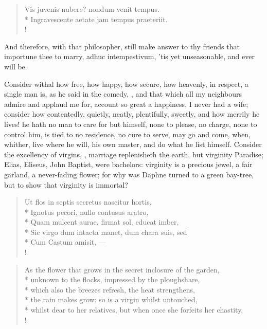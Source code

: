 \begin{latin}%
\begin{verse}%
Vis juvenis nubere? nondum venit tempus.\\*
Ingravescente aetate jam tempus praeteriit.\\!
\end{verse}%
\end{latin}%

And therefore, with that philosopher, still make answer to thy friends
that importune thee to marry, adhuc intempestivum, 'tis yet
unseasonable, and ever will be.

Consider withal how free, how happy, how secure, how heavenly, in
respect, a single man is, as he said in the comedy, , and that which all my
neighbours admire and applaud me for, account so great a happiness, I
never had a wife; consider how contentedly, quietly, neatly,
plentifully, sweetly, and how merrily he lives! he hath no man to care
for but himself, none to please, no charge, none to control him, is
tied to no residence, no cure to serve, may go and come, when, whither,
live where he will, his own master, and do what he list himself.
Consider the excellency of virgins,  ,
marriage replenisheth the earth, but virginity Paradise; Elias,
Eliseus, John Baptist, were bachelors: virginity is a precious jewel, a
fair garland, a never-fading flower; for why was Daphne turned to
a green bay-tree, but to show that virginity is immortal?
%
\begin{latin}%
\begin{verse}%
Ut flos in septis secretus nascitur hortis,\\*
Ignotus pecori, nullo contusus aratro,\\*
Quam mulcent aurae, firmat sol, educat imber, \etc{}\\*
Sic virgo dum intacta manet, dum chara suis, sed\\*
Cum Castum amisit, \etc{}---\\!
\end{verse}%
\end{latin}%
\translationrule%
\begin{verse}%
As the flower that grows in the secret inclosure of the garden,\\*
unknown to the flocks, impressed by the ploughshare,\\*
which also the breezes refresh, the heat strengthens,\\*
the rain makes grow: so is a virgin whilst untouched,\\*
whilst dear to her relatives, but when once she forfeits her chastity, \etc{}\\!
\end{verse}%
%

